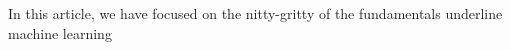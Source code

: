 In this article, we have focused on the nitty-gritty of the fundamentals underline  machine learning 